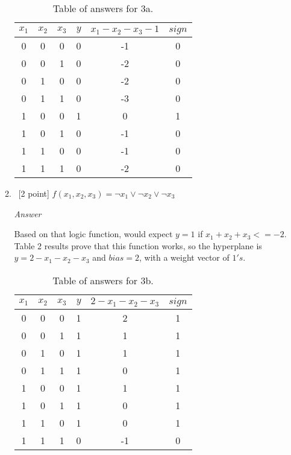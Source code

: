 \documentclass[12pt, fullpage,letterpaper]{article}
\begin{document}
\begin{enumerate}
\begin{enumerate}
		\begin{table}
        	\centering
        	\begin{tabular}{ccccc|c}
        		$x_1 $ & $x_2$ & $x_3$ & $y$ & $x_1-x_2-x_3-1$ & $sign$\\ 
        		\hline\hline
        		0 & 0 & 0 & 0 & -1 & 0 \\ \hline
        		0 & 0 & 1 & 0 & -2 & 0 \\ \hline
        		0 & 1 & 0 & 0 & -2 & 0 \\ \hline
        		0 & 1 & 1 & 0 & -3 & 0 \\ \hline
        		1 & 0 & 0 & 1 &  0 & 1 \\ \hline
        		1 & 0 & 1 & 0 & -1 & 0 \\ \hline
        		1 & 1 & 0 & 0 & -1 & 0 \\ \hline
        		1 & 1 & 1 & 0 & -2 & 0 \\ \hline
        	\end{tabular}
        	\caption{Table of answers for 3a.}\label{tb:1}
        \end{table}
		
		\item~[2 point] $f(x_1, x_2, x_3) = \neg x_1 \lor \neg x_2 \lor \neg x_3$ 
		
		\emph{Answer}
		
		Based on that logic function, would expect $y=1$ if $x_1+x_2+x_3<=-2$. Table 2 results prove that this function works, so the hyperplane is $y=2-x_1-x_2-x_3$ and $bias=2$, with a weight vector of $1's$.
		
		\begin{table}
        	\centering
        	\begin{tabular}{ccccc|c}
        		$x_1 $ & $x_2$ & $x_3$ & $y$ & $2-x_1-x_2-x_3$ & $sign$\\ 
        		\hline\hline
        		0 & 0 & 0 & 1 &  2 & 1 \\ \hline
        		0 & 0 & 1 & 1 &  1 & 1 \\ \hline
        		0 & 1 & 0 & 1 &  1 & 1 \\ \hline
        		0 & 1 & 1 & 1 &  0 & 1 \\ \hline
        		1 & 0 & 0 & 1 &  1 & 1 \\ \hline
        		1 & 0 & 1 & 1 &  0 & 1 \\ \hline
        		1 & 1 & 0 & 1 &  0 & 1 \\ \hline
        		1 & 1 & 1 & 0 & -1 & 0 \\ \hline
        	\end{tabular}
        	\caption{Table of answers for 3b.}\label{tb:1}
        \end{table}
		

\end{enumerate}
\end{enumerate}
\end{document}
